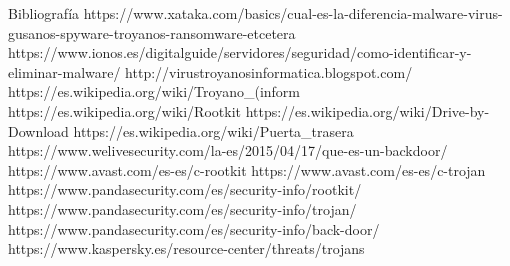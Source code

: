Bibliografía
https://www.xataka.com/basics/cual-es-la-diferencia-malware-virus-gusanos-spyware-troyanos-ransomware-etcetera
https://www.ionos.es/digitalguide/servidores/seguridad/como-identificar-y-eliminar-malware/
http://virustroyanosinformatica.blogspot.com/
https://es.wikipedia.org/wiki/Troyano_(inform%
https://es.wikipedia.org/wiki/Rootkit
https://es.wikipedia.org/wiki/Drive-by-Download
https://es.wikipedia.org/wiki/Puerta_trasera
https://www.welivesecurity.com/la-es/2015/04/17/que-es-un-backdoor/
https://www.avast.com/es-es/c-rootkit
https://www.avast.com/es-es/c-trojan
https://www.pandasecurity.com/es/security-info/rootkit/
https://www.pandasecurity.com/es/security-info/trojan/
https://www.pandasecurity.com/es/security-info/back-door/
https://www.kaspersky.es/resource-center/threats/trojans